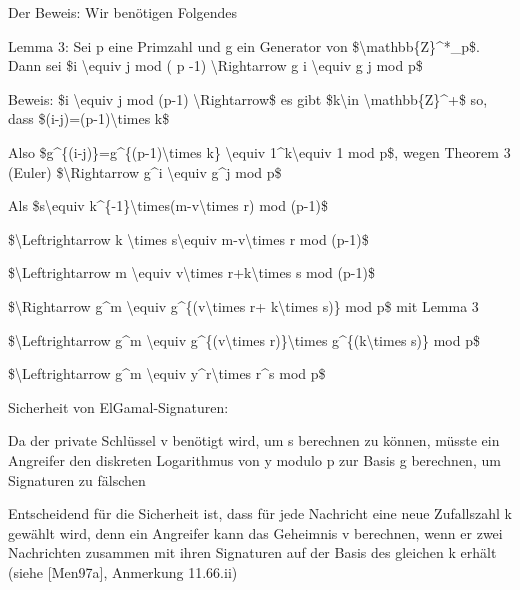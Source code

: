 \documentclass[a4paper]{article}
\begin{document}
\begin{multicols}{3}
\begin{itemize*}
\begin{itemize*}
                  \item Der Beweis: Wir benötigen Folgendes
                  \begin{itemize*} \item Lemma 3: Sei p eine Primzahl und g ein Generator von \$\textbackslash mathbb\{Z\}\^{}*\_p\$. Dann sei \$i \textbackslash equiv j mod ( p -1) \textbackslash Rightarrow g i \textbackslash equiv g j mod p\$ \item Beweis: \$i \textbackslash equiv j mod (p-1) \textbackslash Rightarrow\$ es gibt \$k\textbackslash in \textbackslash mathbb\{Z\}\^{}+\$ so, dass \$(i-j)=(p-1)\textbackslash times k\$ \item Also \$g\^{}\{(i-j)\}=g\^{}\{(p-1)\textbackslash times k\} \textbackslash equiv 1\^{}k\textbackslash equiv 1 mod p\$, wegen Theorem 3 (Euler) \$\textbackslash Rightarrow g\^{}i \textbackslash equiv g\^{}j mod p\$ \end{itemize*}
                  \item Als \$s\textbackslash equiv k\^{}\{-1\}\textbackslash times(m-v\textbackslash times r) mod (p-1)\$
                  \begin{itemize*} \item \$\textbackslash Leftrightarrow k \textbackslash times s\textbackslash equiv m-v\textbackslash times r mod (p-1)\$ \item \$\textbackslash Leftrightarrow m \textbackslash equiv v\textbackslash times r+k\textbackslash times s mod (p-1)\$ \item \$\textbackslash Rightarrow g\^{}m \textbackslash equiv g\^{}\{(v\textbackslash times r+ k\textbackslash times s)\} mod p\$ mit Lemma 3 \item \$\textbackslash Leftrightarrow g\^{}m \textbackslash equiv g\^{}\{(v\textbackslash times r)\}\textbackslash times g\^{}\{(k\textbackslash times s)\} mod p\$ \item \$\textbackslash Leftrightarrow g\^{}m \textbackslash equiv y\^{}r\textbackslash times r\^{}s mod p\$ \end{itemize*}
            \end{itemize*}
            \item Sicherheit von ElGamal-Signaturen:
            \begin{itemize*}
                  \item Da der private Schlüssel v benötigt wird, um s berechnen zu können, müsste ein Angreifer den diskreten Logarithmus von y modulo p zur Basis g berechnen, um Signaturen zu fälschen
                  \item Entscheidend für die Sicherheit ist, dass für jede Nachricht eine neue Zufallszahl k gewählt wird, denn ein Angreifer kann das Geheimnis v berechnen, wenn er zwei Nachrichten zusammen mit ihren Signaturen auf der Basis des gleichen k erhält (siehe {[}Men97a{]}, Anmerkung 11.66.ii)

\end{itemize*}
\end{itemize*}
\end{multicols}
\end{document}
